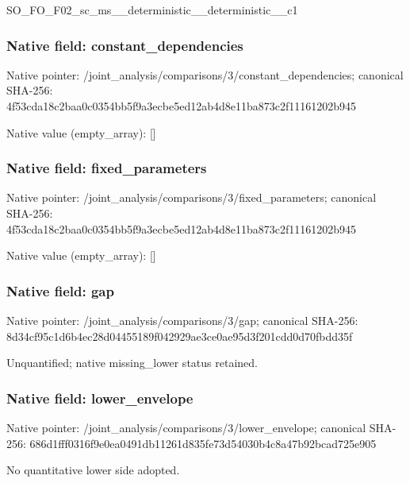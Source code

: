 \documentclass[10pt,a4paper]{article}
\begin{document}
\begingroup\raggedright\sloppy SO\_\allowbreak{}FO\_\allowbreak{}F02\_\allowbreak{}sc\_\allowbreak{}ms\_\allowbreak{}\_\allowbreak{}deterministic\_\allowbreak{}\_\allowbreak{}deterministic\_\allowbreak{}\_\allowbreak{}c1\par\endgroup

\subsubsection{Native field: constant\_\allowbreak{}dependencies}
Native pointer: /joint\_\allowbreak{}analysis/comparisons/3/constant\_\allowbreak{}dependencies; canonical SHA-256: 4f53cda18c2baa0c0354bb5f9a3ecbe5ed12ab4d8e11ba873c2f11161202b945

Native value (empty\_\allowbreak{}array): []

\subsubsection{Native field: fixed\_\allowbreak{}parameters}
Native pointer: /joint\_\allowbreak{}analysis/comparisons/3/fixed\_\allowbreak{}parameters; canonical SHA-256: 4f53cda18c2baa0c0354bb5f9a3ecbe5ed12ab4d8e11ba873c2f11161202b945

Native value (empty\_\allowbreak{}array): []

\subsubsection{Native field: gap}
Native pointer: /joint\_\allowbreak{}analysis/comparisons/3/gap; canonical SHA-256: 8d34cf95c1d6b4ec28d04455189f042929ae3ce0ae95d3f201cdd0d70fbdd35f

\begingroup\raggedright\sloppy Unquantified;\allowbreak{} native missing\_\allowbreak{}lower status retained.\par\endgroup

\subsubsection{Native field: lower\_\allowbreak{}envelope}
Native pointer: /joint\_\allowbreak{}analysis/comparisons/3/lower\_\allowbreak{}envelope; canonical SHA-256: 686d1fff0316f9e0ea0491db11261d835fe73d54030b4c8a47b92bcad725e905

\begingroup\raggedright\sloppy No quantitative lower side adopted.\par\endgroup
\end{document}
